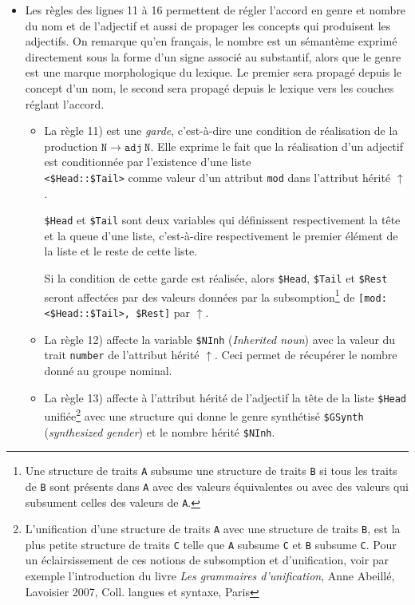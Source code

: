 \documentclass[11pt]{article}
\begin{document}
\begin{itemize}
\item Les règles des lignes 11 à 16 permettent de régler l'accord en
  genre et nombre du nom et de l'adjectif et aussi de propager les
  concepts qui produisent les adjectifs. On remarque qu'en français,
  le nombre est un sémantème exprimé directement sous la forme d'un
  signe associé au substantif, alors que le genre est une marque
  morphologique du lexique. Le premier sera propagé depuis le concept d'un nom, le
  second sera propagé depuis le lexique vers les couches réglant
  l'accord.
  
  \begin{itemize}
  \item La règle 11) est une \textit{garde}, c'est-à-dire une
    condition de réalisation de la production
    $\mathtt{N} \rightarrow \mathtt{adj}~ \mathtt{N}$. Elle exprime le
    fait que la réalisation d'un adjectif est conditionnée par
    l'existence d'une liste\\
    \verb#<$Head::$Tail># comme valeur d'un attribut \texttt{mod}
    dans l'attribut hérité $\uparrow$.
    
    \verb#$Head# et
    \verb#$Tail# sont deux variables qui définissent respectivement la
    tête et la queue d'une liste, c'est-à-dire respectivement le
    premier élément de la liste et le reste de cette liste.
    
    Si la condition de cette garde est réalisée, alors
    \verb#$Head#, \verb#$Tail# et
    \verb#$Rest# seront affectées par des valeurs données par la
    subsomption\footnote{Une structure de traits \texttt{A} subsume
      une structure de traits \texttt{B} si tous les traits de
      \texttt{B} sont présents dans \texttt{A} avec des valeurs
      équivalentes ou avec des valeurs qui subsument celles des
      valeurs de \texttt{A}.}  de \verb#[mod:<$Head::$Tail>, $Rest]#
    par $\uparrow$.
    
  \item La règle 12) affecte la variable
    \verb#$NInh# (\textit{Inherited noun}) avec la valeur du trait
    \texttt{number} de l'attribut hérité
    $\uparrow$. Ceci permet de récupérer le nombre donné au groupe
    nominal.
    
  \item La règle 13) affecte à l'attribut hérité de l'adjectif la tête
    de la liste \verb#$Head# unifiée\footnote{L'unification d'une
      structure de traits \texttt{A} avec une structure de traits
      \texttt{B}, est la plus petite structure de traits \texttt{C}
      telle que \texttt{A} subsume \texttt{C} et \texttt{B} subsume
      \texttt{C}.  Pour un éclairsissement de ces notions de
      subsomption et d'unification, voir par exemple l'introduction du
      livre \textit{Les grammaires d'unification}, Anne Abeillé,
      Lavoisier 2007, Coll. langues et syntaxe, Paris} avec une
    structure qui donne le genre synthétisé
    \verb#$GSynth# (\textit{synthesized gender}) et le nombre hérité
    \verb#$NInh#.
    

\end{itemize}
\end{itemize}
\end{document}
